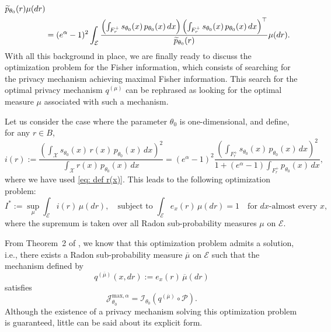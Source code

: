 \documentclass[a4paper, 11pt]{article}
\theoremstyle{definition}
\begin{document}
{\begin{align}{\label{eq : Fisher ctn general_preli}}
{    }{
        \widetilde{p}_{\theta_0}(r)
    }
    \mu(dr) \\
    &=
    (e^\alpha - 1)^2
    \int_\mathcal{E}
    \frac{
        \left( \int_{F_r^+} s_{\theta_0}(x) \, p_{\theta_0}(x) \, dx \right)
        \left( \int_{F_r^+} s_{\theta_0}(x) \, p_{\theta_0}(x) \, dx \right)^{\top}
    }{
        \widetilde{p}_{\theta_0}(r)
    }
    \mu(dr). \nonumber
\end{align}
With all this background in place, we are finally ready to discuss the optimization problem for the Fisher information, which consists of searching for the privacy mechanism achieving maximal Fisher information. This search for the optimal privacy mechanism $q^{(\mu)}$ can be rephrased as looking for the optimal measure $\mu$ associated with such a mechanism.  

Let us consider the case where the parameter $\theta_0$ is one-dimensional, and define, for any $r \in B$,
\begin{equation}\label{eq : def i r ctn}
    i(r) := \frac{
        \left( \int_\mathcal{X} s_{\theta_0}(x) \, r(x) \, p_{\theta_0}(x) \, dx \right)^2
    }{
        \int_\mathcal{X} r(x) \, p_{\theta_0}(x) \, dx
    }
    = (e^\alpha - 1)^2
    \frac{
        \left( \int_{F_r^+} s_{\theta_0}(x) \, p_{\theta_0}(x) \, dx \right)^2
    }{
        1 + (e^\alpha - 1) \int_{F_r^+} p_{\theta_0}(x) \, dx
    },
\end{equation}
where we have used \eqref{eq: def r(x)}. This leads to the following optimization problem:
\begin{equation}\label{eq : optimisation pb ctn}
    I^* := \sup_{\mu}
    \int_\mathcal{E} i(r) \, \mu(dr),
    \quad
    \text{subject to } \int_\mathcal{E} e_x(r) \, \mu(dr) = 1
    \quad \text{for $dx$-almost every } x,
\end{equation}
where the supremum is taken over all Radon sub-probability measures $\mu$ on $\mathcal{E}$.  

From Theorem~2 of \cite{amorino2025factorization}, we know that this optimization problem admits a solution, i.e., there exists a Radon sub-probability measure $\overline{\mu}$ on $\mathcal{E}$ such that the mechanism defined by
\[
q^{(\overline{\mu})}(x,dr) := e_x(r) \, \overline{\mu}(dr)
\]
satisfies
\[
\mathcal{J}^{\text{max},\alpha}_{\theta_0}
= \mathcal{I}_{\theta_0}\left( q^{(\overline{\mu})} \circ \mathcal{P} \right).
\]
Although the existence of a privacy mechanism solving this optimization problem is guaranteed, little can be said about its explicit form.  

}
\end{document}

